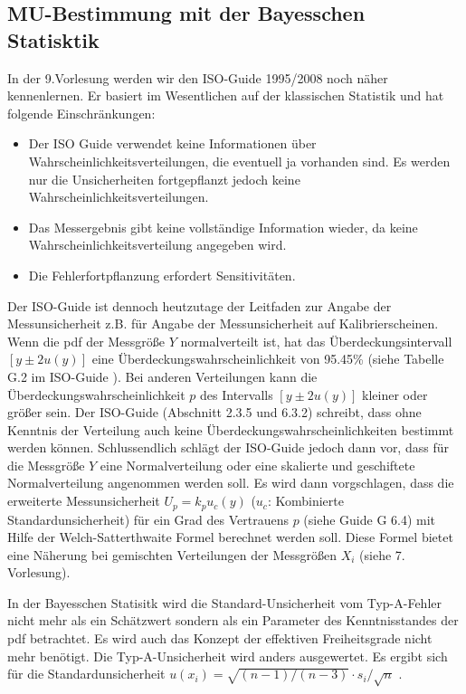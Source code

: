 \subsection{MU-Bestimmung mit der Bayesschen Statisktik}
In der 9.Vorlesung werden wir den ISO-Guide 1995/2008 \cite{GUM95} noch näher kennenlernen. Er basiert im Wesentlichen auf der klassischen Statistik und hat 
folgende Einschränkungen: 
\begin{itemize}\item Der ISO Guide verwendet keine Informationen über 
	Wahrscheinlichkeitsverteilungen, die eventuell ja vorhanden
	sind. Es werden nur die Unsicherheiten fortgepflanzt jedoch keine Wahrscheinlichkeitsverteilungen.
	\item Das Messergebnis gibt keine vollständige Information wieder, da keine Wahrscheinlichkeitsverteilung angegeben wird.
	\item Die Fehlerfortpflanzung erfordert Sensitivitäten.
\end{itemize}
Der ISO-Guide ist dennoch heutzutage der Leitfaden zur Angabe der 
Messunsicherheit z.B. für Angabe der Messunsicherheit auf Kalibrierscheinen.
Wenn die pdf der Messgröße $Y$ normalverteilt ist, hat das Überdeckungsintervall
$[y\pm 2 u(y)]$ eine Überdeckungswahrscheinlichkeit von 95.45\% (siehe Tabelle G.2 im ISO-Guide \cite{GUM95}).
Bei anderen Verteilungen kann die Überdeckungswahrscheinlichkeit $p$ des Intervalls $[y \pm 2 u(y)]$ kleiner oder 
größer sein. Der ISO-Guide (Abschnitt 2.3.5 und 6.3.2) schreibt, dass ohne 
Kenntnis der Verteilung auch keine Überdeckungswahrscheinlichkeiten bestimmt werden können. Schlussendlich schlägt der ISO-Guide jedoch dann vor, dass für die 
Messgröße $Y$ eine Normalverteilung oder eine skalierte und 
geschiftete Normalverteilung angenommen werden soll.
Es wird dann vorgschlagen, dass die erweiterte Messunsicherheit 
$U_p=k_p u_c(y)$ ($u_c$: Kombinierte Standardunsicherheit) für ein Grad des Vertrauens $p$ (siehe Guide G 6.4) mit 
Hilfe der Welch-Satterthwaite Formel berechnet werden soll. Diese Formel
bietet eine Näherung bei gemischten Verteilungen der Messgrößen $X_i$
(siehe 7. Vorlesung).

In der Bayesschen Statisitk wird die Standard-Unsicherheit vom Typ-A-Fehler nicht mehr als ein Schätzwert sondern als ein Parameter des Kenntnisstandes der pdf betrachtet.
Es wird auch das Konzept der effektiven Freiheitsgrade nicht mehr benötigt.
Die Typ-A-Unsicherheit wird anders ausgewertet. Es ergibt sich für die Standardunsicherheit $u(x_i) = \sqrt{(n-1)/(n-3)} \cdot s_i/\sqrt{n}$ \cite{Kac03}. 



